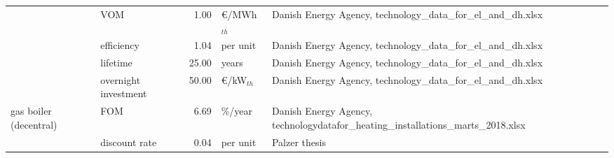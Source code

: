 \begin{longtable}{p{4cm}p{4cm}rp{3cm}p{10cm}}
                      & VOM &         1.00 &              \euro/MWh$_{th}$ &                                                                                                                                                                                                                                                                        Danish Energy Agency, technology\_data\_for\_el\_and\_dh.xlsx \\
                      & efficiency &         1.04 &                      per unit &                                                                                                                                                                                                                                                                        Danish Energy Agency, technology\_data\_for\_el\_and\_dh.xlsx \\
                      & lifetime &        25.00 &                         years &                                                                                                                                                                                                                                                                        Danish Energy Agency, technology\_data\_for\_el\_and\_dh.xlsx \\
                      & overnight investment &        50.00 &               \euro/kW$_{th}$ &                                                                                                                                                                                                                                                                        Danish Energy Agency, technology\_data\_for\_el\_and\_dh.xlsx \\
gas boiler (decentral) & FOM &         6.69 &                       \%/year &                                                                                                                                                                                                                                                    Danish Energy Agency, technologydatafor\_heating\_installations\_marts\_2018.xlsx \\
                      & discount rate &         0.04 &                      per unit &                                                                                                                                                                                                                                                                                                                        Palzer thesis \\

\end{longtable}

